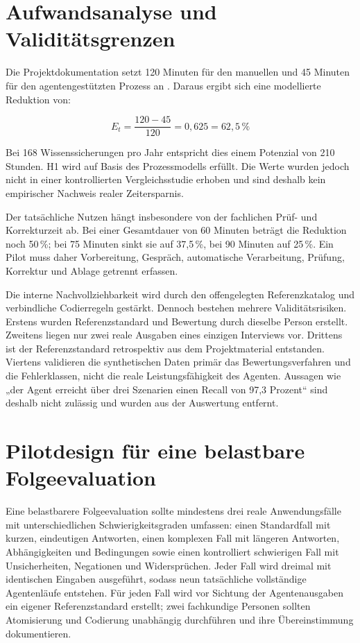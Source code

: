 \documentclass[
  10pt,
  ngerman,
  a4paper,
  toc=graduated,
  numbers=noenddot,
  headings=standardclasses,
  nonumberlist
]{scrartcl}
\newcommand{\pct}[1]{#1\,\%}
\begin{document}
\section{Aufwandsanalyse und Validitätsgrenzen}

Die Projektdokumentation setzt 120 Minuten für den manuellen und 45 Minuten für den agentengestützten Prozess an \cite{sommer2026projekt}. Daraus ergibt sich eine modellierte Reduktion von:

\begin{equation}
E_t = \frac{120-45}{120} = 0{,}625 = \pct{62{,}5}
\end{equation}

Bei 168 Wissenssicherungen pro Jahr entspricht dies einem Potenzial von 210 Stunden. H1 wird auf Basis des Prozessmodells erfüllt. Die Werte wurden jedoch nicht in einer kontrollierten Vergleichsstudie erhoben und sind deshalb kein empirischer Nachweis realer Zeitersparnis.

Der tatsächliche Nutzen hängt insbesondere von der fachlichen Prüf- und Korrekturzeit ab. Bei einer Gesamtdauer von 60 Minuten beträgt die Reduktion noch \pct{50}; bei 75 Minuten sinkt sie auf \pct{37{,}5}, bei 90 Minuten auf \pct{25}. Ein Pilot muss daher Vorbereitung, Gespräch, automatische Verarbeitung, Prüfung, Korrektur und Ablage getrennt erfassen.

Die interne Nachvollziehbarkeit wird durch den offengelegten Referenzkatalog und verbindliche Codierregeln gestärkt. Dennoch bestehen mehrere Validitätsrisiken. Erstens wurden Referenzstandard und Bewertung durch dieselbe Person erstellt. Zweitens liegen nur zwei reale Ausgaben eines einzigen Interviews vor. Drittens ist der Referenzstandard retrospektiv aus dem Projektmaterial entstanden. Viertens validieren die synthetischen Daten primär das Bewertungsverfahren und die Fehlerklassen, nicht die reale Leistungsfähigkeit des Agenten. Aussagen wie „der Agent erreicht über drei Szenarien einen Recall von 97,3 Prozent“ sind deshalb nicht zulässig und wurden aus der Auswertung entfernt.

\section{Pilotdesign für eine belastbare Folgeevaluation}

Eine belastbarere Folgeevaluation sollte mindestens drei reale Anwendungsfälle mit unterschiedlichen Schwierigkeitsgraden umfassen: einen Standardfall mit kurzen, eindeutigen Antworten, einen komplexen Fall mit längeren Antworten, Abhängigkeiten und Bedingungen sowie einen kontrolliert schwierigen Fall mit Unsicherheiten, Negationen und Widersprüchen. Jeder Fall wird dreimal mit identischen Eingaben ausgeführt, sodass neun tatsächliche vollständige Agentenläufe entstehen. Für jeden Fall wird vor Sichtung der Agentenausgaben ein eigener Referenzstandard erstellt; zwei fachkundige Personen sollten Atomisierung und Codierung unabhängig durchführen und ihre Übereinstimmung dokumentieren.
\end{document}
